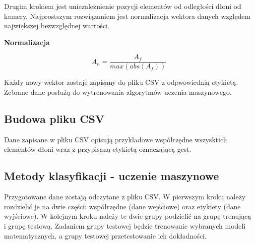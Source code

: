 \quad Drugim krokiem jest uniezależnienie pozycji elementów od odległości dłoni od kamery. Najprostszym rozwiązaniem jest normalizacja wektora danych względem największej bezwzględnej wartości. 

\quad \textbf{Normalizacja}



\begin{equation*}
    A_n=\dfrac{A_f}{max(abs(A_f))}
\end{equation*}

\quad Każdy nowy wektor zostaje zapisany do pliku CSV z odpwowiednią etykietą. Zebrane dane posłużą do wytrenowania algorytmów uczenia maszynowego.     

\subsection{Budowa pliku CSV}
\quad Dane zapisane w pliku CSV opisują przykładowe współrzędne wszysktich elementów dłoni wraz z przypisaną etykietą oznaczającą gest. 

\subsection{Metody klasyfikacji - uczenie maszynowe}

\quad Przygotowane dane zostają odczytane z pliku CSV. W pierwszym kroku należy rozdzielić je na dwie części: współrzędne (dane wejściowe) oraz etykiety (dane wyjściowe). W kolejnym kroku należy te dwie grupy podzielić na grupę trenującą i grupę testową. Zadaniem grupy testowej będzie trenowanie wybranych modeli matematycznych, a grupy testowej przetestowanie ich dokładności. 

